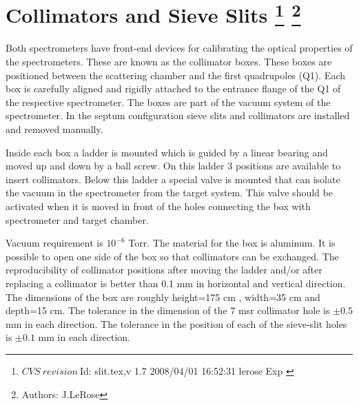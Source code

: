 \section[Collimators and Sieve Slits]{Collimators and Sieve Slits
\footnote{
  $CVS~revision~ $Id: slit.tex,v 1.7 2008/04/01 16:52:31 lerose Exp $ $ 
}
\footnote{Authors: J.LeRose }
}

Both spectrometers have front-end devices for calibrating the optical
properties of the spectrometers. These are known as the collimator boxes.
These boxes are positioned between the scattering chamber and the 
first quadrupoles (Q1). Each box is carefully aligned and rigidly attached
to the  entrance flange of the Q1 of the respective spectrometer.  The boxes are
part of the vacuum system of the spectrometer.
In the septum configuration sieve slits and collimators are installed and removed manually.

Inside each box a ladder is mounted which is guided by a linear bearing
and moved up and down by a ball screw. On this ladder 3 positions are 
available to insert collimators. Below this ladder
a special valve is mounted that can isolate the vacuum in the spectrometer
from the target system. This valve should be activated when it is moved
in front of the holes connecting the box with spectrometer and target chamber.

Vacuum requirement is $10^{-6}$ Torr. The material for the box is 
aluminum. It is possible to open one side of the box so that
collimators can be exchanged. The
reproducibility of collimator positions after moving
the ladder and/or after replacing a collimator is
better than 0.1 mm in horizontal and vertical direction.
The dimensions of the box are
roughly height=175 cm , width=35 cm and depth=15 cm.
The tolerance in the dimension
of the 7 msr collimator hole is $\pm0.5$ mm in each direction. 
The tolerance in the position
of each of the sieve-slit holes is $\pm0.1$ mm in each direction.

